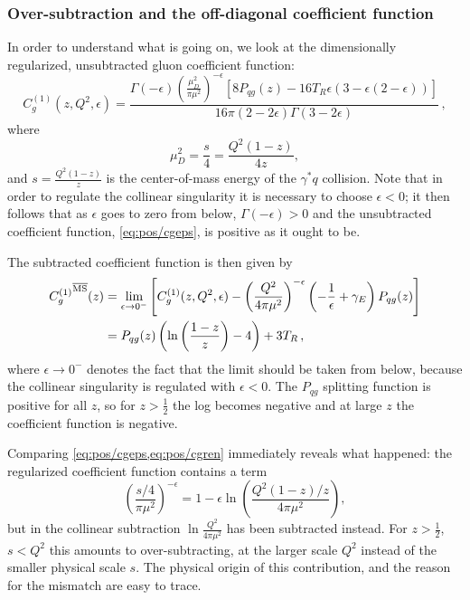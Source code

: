  
\subsubsection{Over-subtraction and the off-diagonal coefficient function}
\label{sec:offdiag}

In order to understand what is going on, we look at the dimensionally
regularized, unsubtracted gluon coefficient function:
\begin{equation}\label{eq:pos/cgeps}
C^{(1)}_{g}(z,Q^2,\epsilon) = \frac{ \Gamma(-\epsilon)
  \left(\frac{\mu_D^2}{\pi\mu^2}\right)^{-\epsilon} \left[8P_{qg}(z)-16 T_R \epsilon (3
    -\epsilon(2 -\epsilon) )  \right]  }{16\pi (2 - 2\epsilon) \Gamma (3 - 2 \epsilon)}\,,
\end{equation}
where
\begin{equation}\label{eq:pos/mud}
  \mu_D^2=\frac{s}{4}=\frac{Q^2(1-z)}{4z},
\end{equation} 
and  $s=\frac{Q^2(1-z)}{z}$ is the center-of-mass energy of the
$\gamma^* q$ collision. 
Note that in order to regulate the collinear singularity it is
necessary to choose $\epsilon<0$; it then follows that  as $\epsilon$
goes to zero from below,
$\Gamma(-\epsilon)>0$ and
the unsubtracted coefficient function, \cref{eq:pos/cgeps}, is positive as it ought to
be.

The subtracted \msbar{} coefficient function is then given by
\begin{align}\label{eq:pos/cgren}
{C^{(1)}_{g}}^{{\overline{\textrm{MS}}}}(z) &= \lim_{\epsilon\to
  0^-}\left[C_{g}^{(1)}(z,Q^2,\epsilon) - \left(\frac{Q^2}{4\pi
      \mu^2}\right)^{-\epsilon} \left(-\frac 1
    {\epsilon}+\gamma_E\right) P_{qg}(z)\right]\\
    &= P_{qg}(z) \left( \ln\left(\frac{1-z}{z}\right) - 4 \right) + 3
    T_R \, ,\label{eq:pos/cgnlo}
\end{align}
where  $\epsilon\to 0^-$ denotes the fact that the limit should be
taken from below, because the collinear singularity is regulated with
$\epsilon<0$. 
The $P_{qg}$ splitting function is positive for all $z$, so for
$z>\frac{1}{2}$ the log  becomes negative and at large $z$ the
coefficient function is negative.


Comparing \cref{eq:pos/cgeps,eq:pos/cgren} immediately reveals
what happened:  the regularized coefficient function contains a term
\begin{equation}\label{eq:pos/logexp}
  \left(\frac{s/4}{\pi\mu^2}\right)^{-\epsilon}=1-\epsilon \ln \left(\frac{Q^2(1-z)/z}{4\pi\mu^2}\right),
\end{equation}
but in the collinear subtraction $\ln \frac{Q^2}{4\pi\mu^2}$ has been
subtracted instead. For $z>\frac{1}{2}$, $s<Q^2$ this
amounts to over-subtracting, at the larger scale $Q^2$ instead of the
smaller physical scale $s$. The physical origin of this contribution,
and the reason for the mismatch are easy to trace.

